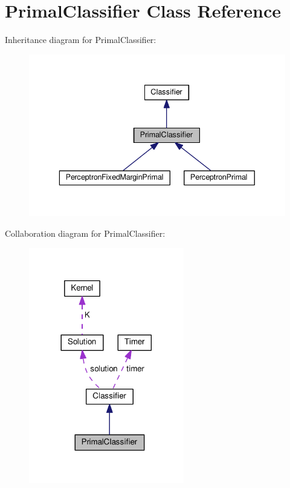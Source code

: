 \hypertarget{class_primal_classifier}{}\section{Primal\+Classifier Class Reference}
\label{class_primal_classifier}


Inheritance diagram for Primal\+Classifier\+:\nopagebreak
\begin{figure}[H]
\begin{center}
\leavevmode
\includegraphics[width=336pt]{class_primal_classifier__inherit__graph}
\end{center}
\end{figure}


Collaboration diagram for Primal\+Classifier\+:\nopagebreak
\begin{figure}[H]
\begin{center}
\leavevmode
\includegraphics[width=192pt]{class_primal_classifier__coll__graph}
\end{center}
\end{figure}
